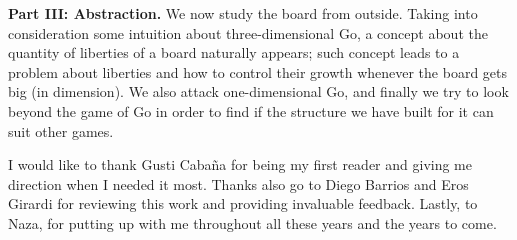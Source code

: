 \textbf{Part III: Abstraction.} We now study the board from outside. Taking into consideration some intuition about three-dimensional Go, a concept about the quantity of liberties of a board naturally appears; such concept leads to a problem about liberties and how to control their growth whenever the board gets big (in dimension). We also attack one-dimensional Go, and finally we try to look beyond the game of Go in order to find if the structure we have built for it can suit other games.


\vfill

I would like to thank Gusti Cabaña for being my first reader and giving me direction when I needed it most. Thanks also go to Diego Barrios and Eros Girardi for reviewing this work and providing invaluable feedback. Lastly, to Naza, for putting up with me throughout all these years and the years to come.

\clearpage

\tableofcontents
\thispagestyle{empty}
\clearpage

